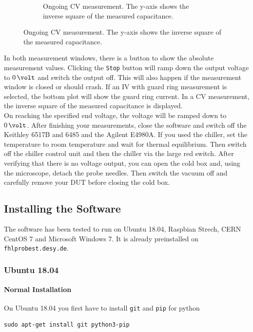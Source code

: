 \documentclass[a4paper]{article}
\begin{document}
\begin{figure}[hbtp]
\begin{subfigure}[t]{0.475\textwidth}
\caption[Running CV Measurement]{Ongoing CV measurement. The y-axis shows the inverse square of the measured capacitance.}
\label{fig:cvmeas}
\end{subfigure}
\end{figure}

In both measurement windows, there is a button to show the absolute measurement values.
Clicking the {\tt Stop} button will ramp down the output voltage to $0\,\volt$ and switch the output off.
This will also happen if the measurement window is closed or should crash.
If an IV with guard ring measurement is selected, the bottom plot will show the guard ring current.
In a CV measurement, the inverse square of the measured capacitance is displayed.\\

On reaching the specified end voltage, the voltage will be ramped down to $0\,\volt$.
After finishing your measurements, close the software and switch off the Keithley 6517B and 6485 and the Agilent E4980A.
If you used the chiller, set the temperature to room temperature and wait for thermal equilibrium.
Then switch off the chiller control unit and then the chiller via the large red switch.
After verifying that there is no voltage output, you can open the cold box and, using the microscope, detach the probe needles.
Then switch the vacuum off and carefully remove your DUT before closing the cold box.\\

\subsection{Installing the Software}
\label{sec:installation}

The software has been tested to run on Ubuntu 18.04, Raspbian Strech, CERN CentOS 7 and Microsoft Windows 7.
It is already preinstalled on {\tt fhlprobest.desy.de}.

\subsubsection{Ubuntu 18.04}

\paragraph{Normal Installation\\}
On Ubuntu 18.04 you first have to install {\tt git} and {\tt pip} for python

\medskip
\begin{lstlisting}
sudo apt-get install git python3-pip
\end{lstlisting}
\medskip
\end{document}
